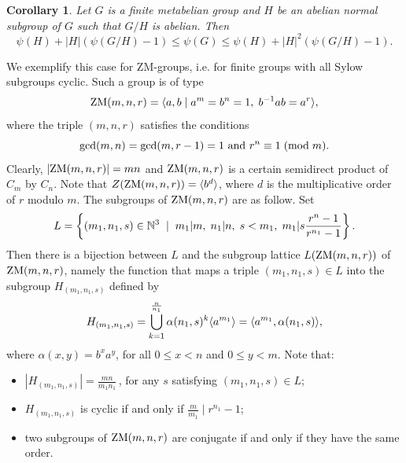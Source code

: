 \documentclass[12pt]{article}
\newtheorem{corollary}[theorem]{Corollary}
\newcommand{\0}{{\leqno}}
\begin{document}
\begin{corollary}
Let $G$ is a finite metabelian group and $H$ be an abelian normal subgroup of $G$ such that $G/H$ is abelian. Then
\begin{equation}
\psi(H)+|H|(\psi(G/H)-1)\leq\psi(G)\leq\psi(H)+|H|^2(\psi(G/H)-1).\nonumber
\end{equation}
\end{corollary}

We exemplify this case for ZM-groups, i.e. for finite groups with all Sylow subgroups cyclic. Such a group is of type
\begin{equation}
{\rm ZM}(m,n,r)=\langle a, b \mid a^m = b^n = 1,
\hspace{1mm}b^{-1} a b = a^r\rangle, \nonumber
\end{equation}where the triple $(m,n,r)$ satisfies the conditions
\begin{equation}
{\rm gcd}(m,n)={\rm gcd}(m,r-1)=1 \mbox{ and } r^n
\equiv 1 \hspace{1mm}({\rm mod}\hspace{1mm}m). \nonumber
\end{equation}Clearly, $|{\rm ZM}(m,n,r)|=mn$ and ${\rm ZM}(m,n,r)$ is a certain semidirect product of $C_m$ by $C_n$. Note that $Z({\rm ZM}(m,n,r))=\langle b^d\rangle$, where $d$ is the multiplicative order of $r$ modulo $m$. The subgroups of ${\rm ZM}(m,n,r)$ are as follow. Set
\begin{equation}
L=\left\{(m_1,n_1,s)\in\mathbb{N}^3 \hspace{1mm}\mid\hspace{1mm}
m_1|m,\hspace{1mm} n_1|n,\hspace{1mm} s<m_1,\hspace{1mm}
m_1|s\frac{r^n-1}{r^{n_1}-1}\right\}.\nonumber
\end{equation}Then there is a bijection between $L$ and the subgroup lattice
$L({\rm ZM}(m,n,r))$ of ${\rm ZM}(m,n,r)$, namely the function
that maps a triple $(m_1,n_1,s)\in L$ into the subgroup $H_{(m_1,n_1,s)}$ defined by\vspace{-1mm}
\begin{equation}
H_{(m_1,n_1,s)}=\bigcup_{k=1}^{\frac{n}{n_1}}\alpha(n_1,
s)^k\langle a^{m_1}\rangle=\langle a^{m_1},\alpha(n_1, s)\rangle,\vspace{-1mm}\nonumber
\end{equation}where $\alpha(x, y)=b^xa^y$, for all $0\leq x<n$ and $0\leq y<m$.
Note that:
\begin{itemize}
\item[-] $|H_{(m_1,n_1,s)}|=\frac{mn}{m_1n_1}$\,, for any $s$ satisfying $(m_1,n_1,s)\in L$;
\item[-] $H_{(m_1,n_1,s)}$ is cyclic if and only if $\frac{m}{m_1}\mid r^{n_1}-1$;
\item[-] two subgroups of ${\rm ZM}(m,n,r)$ are conjugate if and only if they have the same order.
\end{itemize}
\end{document}
